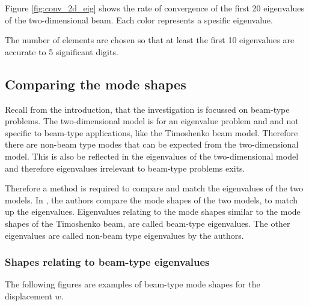 	Figure \ref{fig:conv_2d_eig} shows the rate of convergence of the first 20 eigenvalues of the two-dimensional beam. Each color represents a spesific eigenvalue.

	The number of elements are chosen so that at least the first 10 eigenvalues are accurate to 5 significant digits.

	\subsection{Comparing the mode shapes}
	Recall from the introduction, that the investigation is focussed on beam-type problems. The two-dimensional model is for an eigenvalue problem and and not specific to beam-type applications, like the Timoshenko beam model. Therefore there are non-beam type modes that can be expected from the two-dimensional model. This is also be reflected in the eigenvalues of the two-dimensional model and therefore eigenvalues irrelevant to beam-type problems exits.

	Therefore a method is required to compare and match the eigenvalues of the two models. In \cite{LVV09}, the authors compare the mode shapes of the two models, to match up the eigenvalues. Eigenvalues relating to the mode shapes similar to the mode shapes of the Timoshenko beam, are called beam-type eigenvalues. The other eigenvalues are called non-beam type eigenvalues by the authors.

	\subsubsection{Shapes relating to beam-type eigenvalues}
	The following figures are examples of beam-type mode shapes for the displacement $w$.

